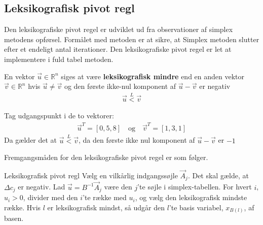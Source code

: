 \subsection{Leksikografisk pivot regl}
Den leksikografiske pivot regel er udviklet ud fra observationer af simplex metodens opførsel. Formålet med metoden er at sikre, at Simplex metoden slutter efter et endeligt antal iterationer. Den leksikografiske pivot regel er let at implementere i fuld tabel metoden. 
\begin{defn}
En vektor $\vec{u} \in \mathds{R}^n$ siges at være \textbf{leksikografisk mindre} end en anden vektor $\vec{v} \in \mathds{R}^n$ hvis $\vec{u} \neq \vec{v}$ og den første ikke-nul komponent af $\vec{u}-\vec{v}$ er negativ 
\begin{align*}
\vec{u} \overset{L}{<} \vec{v}
\end{align*}
\end{defn}
\begin{eks}
Tag udgangspunkt i de to vektorer: 
\begin{align*}
\vec{u}^T=[0,5,8]\quad 
\text{og}
\quad \vec{v}^T=[1,3,1] 
\end{align*}
Da gælder det at $\vec{u} \overset{L}{<} \vec{v}$, da den første ikke nul komponent af $\vec{u}-\vec{v}$ er $-1$
\end{eks}

Fremgangsmåden for den leksikografiske pivot regel er som følger.
  
\begin{pro}{Leksikografisk pivot regl}
Vælg en vilkårlig indgangssøjle $\vec{A}_j$. Det skal gælde, at $\Delta c_j$ er negativ. Lad $\vec{u}=B^{-1}\vec{A}_j$ være den $j$'te søjle i simplex-tabellen.
For hvert $i$, $u_i>0$, divider med den $i$'te række med $u_i$, og vælg den leksikografisk mindste række. Hvis $l$ er leksikografisk mindst, så udgår den $l$'te basis variabel, $x_{B(l)}$, af basen. 
\end{pro}

